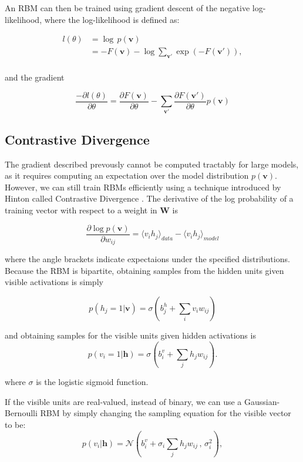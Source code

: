 \documentclass{article}
\begin{document}
An RBM can then be trained using gradient descent of the negative
log-likelihood, where the log-likelihood is defined as:

\begin{align*}
  l(\theta) &= \log \, p(\mathbf{v}) \\
            &= -F(\mathbf{v}) - \log \sum_{\mathbf{v'}} \exp \left(-F(\mathbf{v'})\right), \\
\end{align*}

and the gradient

\[
  \frac{- \partial l(\theta)}{\partial \theta}
  = \frac{\partial F(\mathbf{v})}{\partial \theta} - 
  \sum_{\mathbf{v'}}\frac{\partial F(\mathbf{v'})}{\partial \theta}
                  p(\mathbf{v})
\]


\subsection{Contrastive Divergence}

The gradient described prevously cannot be computed tractably for large models,
as it requires computing an expectation over the model distribution
$p(\mathbf{v})$.  However, we can still train RBMs efficiently using a
technique introduced by Hinton called Contrastive Divergence
\cite{hinton_contrastivedivergence}. The derivative of the log probability of a
training vector with respect to a weight in $\mathbf{W}$ is 

\[
  \frac{\partial \log p(\mathbf{v})}{\partial w_{ij}} = 
  \langle v_i h_j \rangle_{data} - \langle v_i h_j \rangle_{model}
\]

where the angle brackets indicate expectaions under the specified distributions.
Because the RBM is bipartite, obtaining samples from the hidden units given
visible activations is simply

\[
  p (h_j = 1 | \mathbf{v}) = \sigma\left(b_{j}^{h} + \sum_i v_{i} w_{ij}\right)
\]

and obtaining samples for the visible units given hidden activations is
\[
  p (v_i = 1 | \mathbf{h}) = \sigma\left(b_{i}^{v} + \sum_j h_j w_{ij}\right).
\]

where $\sigma$ is the logistic sigmoid function.

If the visible units are real-valued, instead of binary, we can use a
Gaussian-Bernoulli RBM by simply changing the sampling equation for the visible
vector to be:
\[
  p (v_i | \mathbf{h}) = \mathcal{N} \left( b_{i}^{v} +
    \sigma_i \sum_j h_j w_{ij} \,,\, \sigma_i^2 \right),
\]
\end{document}
